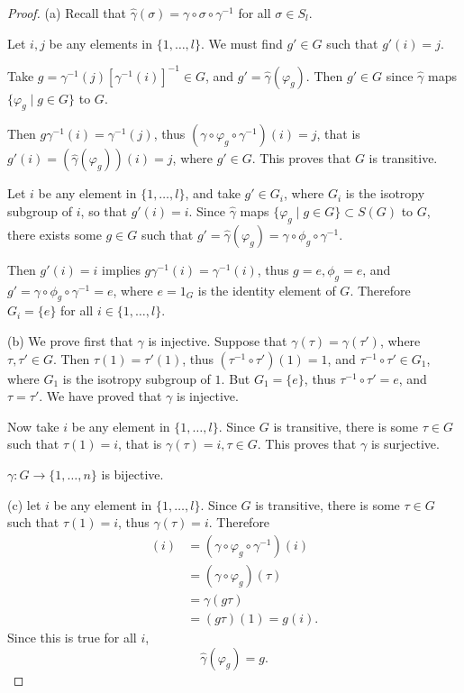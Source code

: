 \documentclass[11pt,a4paper]{article}
\begin{document}
  \begin{proof}
  \item[(a)] Recall that $\hat \gamma(\sigma) = \gamma \circ \sigma \circ \gamma^{-1}$ for all $\sigma \in S_l$.
  
  Let $i,j$ be any elements in $\{1,\ldots,l\}$. We must find $g' \in G$ such that $g'(i) = j$.
  
  Take $g = \gamma^{-1}(j) [\gamma^{-1}(i)]^{-1} \in G$, and $g' = \hat \gamma(\varphi_g)$. Then $g' \in G$ since $\hat \gamma$ maps ${\{\varphi_g \mid g \in G\}}$ to $G$.
  
  Then $g \gamma^{-1}(i) = \gamma^{-1}(j)$, thus $(\gamma \circ \varphi_g \circ \gamma^{-1})(i) = j$, that is $g' (i) = (\hat \gamma(\varphi_g))(i) = j$, where $g' \in G$. This proves that $G$ is transitive.
  
  Let $i$ be any element in $\{1,\ldots,l\}$, and take  $g' \in G_i$, where $G_i$ is the isotropy subgroup of $i$, so that $g'(i) = i$. Since $\hat \gamma$ maps $\{\varphi_g \mid g \in G\} \subset S(G)$ to $G$, there exists some $g \in G$ such that $g' = \hat \gamma(\varphi_g) =\gamma \circ \phi_g \circ \gamma^{-1}$.
  
  Then $g'(i) = i$ implies $g \gamma^{-1}(i) = \gamma^{-1}(i)$, thus $g = e , \phi_g = e$, and $g' = \gamma \circ \phi_g \circ \gamma^{-1} = e$, where $e = 1_G$ is the identity element of $G$. Therefore $G_i=\{e\}$ for all $i \in \{1,\ldots,l\}$.
  
 \item[(b)] We prove first that $\gamma$ is injective. Suppose that $\gamma(\tau) = \gamma(\tau')$, where $\tau,\tau' \in G$. Then $\tau(1) = \tau'(1)$, thus $(\tau^{-1} \circ \tau')(1) = 1$, and $\tau^{-1} \circ \tau' \in G_1$, where $G_1$ is the isotropy subgroup of $1$. But $G_1 = \{e\}$, thus $\tau^{-1} \circ \tau' = e$, and $\tau = \tau'$. We have proved that $\gamma$ is injective.
 
 Now take $i$ be any element in $\{1,\ldots,l\}$. Since $G$ is transitive, there is some $\tau \in G$ such that $\tau(1) = i$, that is $\gamma(\tau) = i, \tau \in G$. This proves that $\gamma$ is surjective.
 
 $\gamma : G \to \{1,\ldots,n\}$ is bijective.
 
 \item[(c)] let $i$ be any element in $\{1,\ldots,l\}$. Since $G$ is transitive, there is some $\tau \in G$ such that $\tau(1) = i$, thus $\gamma(\tau) = i$. Therefore
 \begin{align*}
 [\hat \gamma(\varphi_g)](i) &= (\gamma \circ \varphi_g \circ \gamma^{-1})(i)\\
 &= (\gamma \circ \varphi_g)(\tau)\\
 &= \gamma(g\tau)\\
 &= (g\tau)(1) = g(i).
 \end{align*}
 Since this is true for all $i$,
 $$\hat \gamma(\varphi_g) = g.$$



\end{proof}
\end{document}
